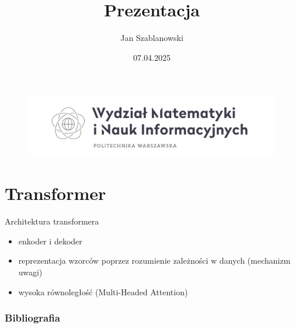 \documentclass{beamer}
\author{Jan Szablanowski}
\title{Prezentacja}
\date{07.04.2025}
\begin{document}
\beamertemplatenavigationsymbolsempty
\begin{frame}[plain]
    \begin{figure}
        \begin{center}
            \includegraphics[width=0.8\linewidth]{img/logo.png}
        \end{center}
    \end{figure}
    \vspace{-4mm}
    \titlepage
\end{frame}

\begin{frame}
    \tableofcontents[sectionstyle=show,subsectionstyle=show/shaded/hide,subsubsectionstyle=show/shaded/hide]
\end{frame}

\section{Transformer}

\begin{frame}{Architektura transformera \cite{vaswani2023attentionneed}}
    \begin{itemize}
        \setlength\itemsep{1em}
        \item enkoder i dekoder
        \item reprezentacja wzorców poprzez rozumienie zależności w danych (mechanizm uwagi)
        \item wysoka równoległość (Multi-Headed Attention)
    \end{itemize}
\end{frame}

\begin{frame}[allowframebreaks]
    \frametitle{Bibliografia}
    \nocite{*}
    
    
\end{frame}
\end{document}
